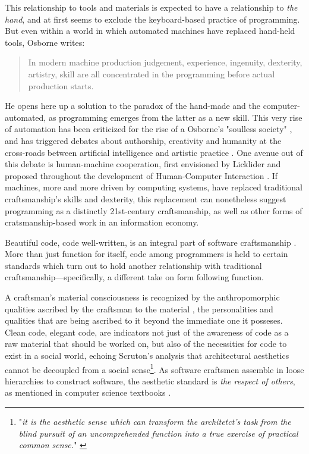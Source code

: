 This relationship to tools and materials is expected to have a relationship to \emph{the hand}, and at first seems to exclude the keyboard-based practice of programming. But even within a world in which automated machines have replaced hand-held tools, Osborne writes:

\begin{quote}
    In modern machine production judgement, experience, ingenuity, dexterity, artistry, skill are all concentrated in the programming before actual production starts. \citep{osborne_aesthetic_1977}
\end{quote}

He opens here up a solution to the paradox of the hand-made and the computer-automated, as programming emerges from the latter as a new skill. This very rise of automation has been criticized for the rise of a Osborne's "soulless society" \citep{osborne_aesthetic_1977}, and has triggered debates about authorship, creativity and humanity at the cross-roads between artificial intelligence and artistic practice \citep{mazzone_art_2019}. One avenue out of this debate is human-machine cooperation, first envisioned by Licklider and proposed throughout the development of Human-Computer Interaction \citep{licklider_mancomputer_1960,grudin_tool_2016}. If machines, more and more driven by computing systems, have replaced traditional craftsmanship's skills and dexterity, this replacement can nonetheless suggest programming as a distinctly 21st-century craftsmanship, as well as other forms of cratsmanship-based work in an information economy.

Beautiful code, code well-written, is an integral part of software craftsmanship \citep{oram_beautiful_2007}. More than just function for itself, code among programmers is held to certain standards which turn out to hold another relationship with traditional craftsmanship—specifically, a different take on form following function.

A craftsman's material consciousness is recognized by the anthropomorphic qualities ascribed by the craftsman to the material \citep{sennett_craftsman_2009}, the personalities and qualities that are being ascribed to it beyond the immediate one it posseses. Clean code, elegant code, are indicators not just of the awareness of code as a raw material that should be worked on, but also of the necessities for code to exist in a social world, echoing Scruton's analysis that architectural aesthetics cannot be decoupled from a social sense\footnote{"\emph{it is the aesthetic sense which can transform the architetct's task from the blind pursuit of an uncomprehended function into a true exercise of practical common sense.}" \citep{scruton_aesthetics_2013}}. As software craftsmen assemble in loose hierarchies to construct software, the aesthetic standard is \emph{the respect of others}, as mentioned in computer science textbooks \citep{abelson_structure_1979}.


